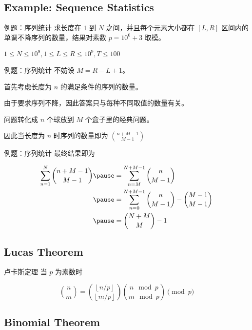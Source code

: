 \documentclass[12pt,aspectratio=169]{beamer}
\begin{document}
\subsection[例题：序列统计]{Example: Sequence Statistics}

\begin{frame}[fragile]{例题：序列统计}
求长度在 $1$ 到 $N$ 之间，并且每个元素大小都在 $[L, R]$ 区间内的单调不降序列的数量，结果对素数 $p=10^6+3$ 取模。

$1 \le N \le 10^9, 1 \le L \le R \le 10^9, T \le 100$
\end{frame}

\begin{frame}[fragile]{例题：序列统计}
不妨设 $M=R-L+1$。

首先考虑长度为 $n$ 的满足条件的序列的数量。

由于要求序列不降，因此答案只与每种不同取值的数量有关。

问题转化成 $n$ 个球放到 $M$ 个盒子里的经典问题。

因此当长度为 $n$ 时序列的数量即为 ${n+M-1 \choose M-1}$
\end{frame}

\begin{frame}[fragile]{例题：序列统计}
最终结果即为

$$
\begin{aligned}
\sum_{n=1}^{N} {n+M-1 \choose M-1} \pause
&= \sum_{n=M}^{N+M-1} {n \choose M-1} \\ \pause
&= \sum_{n=0}^{N+M-1} {n \choose M-1} - {M-1 \choose M-1} \\ \pause
&= {N+M \choose M} - 1
\end{aligned}
$$
\end{frame}

\subsection[卢卡斯定理]{Lucas Theorem}

\begin{frame}[fragile]{卢卡斯定理}
当 $p$ 为素数时

$$
{n \choose m} = {\left\lfloor n/p \right\rfloor \choose \left\lfloor m/p \right\rfloor} {n \mod p \choose m \mod p} \pmod{p}
$$
\end{frame}

\subsection[二项式定理]{Binomial Theorem}
\end{document}
